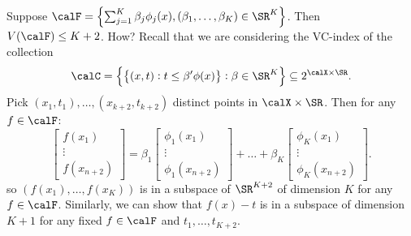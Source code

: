 \begin{example*}
	Suppose \(\calF = \left\{\sum_{j=1}^K \beta_j\phi_j(x), \left(\beta_1,\dots,\beta_K\right)\in\SR^K\right\}\). Then \(V(\calF) \leq K+2\). How? Recall that we are considering the VC-index of the collection
	\[
	\calC = \left\{\left\{(x,t): t \leq \beta'\phi(x)\right\}: \beta\in\SR^K\right\} \subseteq 2^{\calX\times\SR} 
	.\]
	Pick \((x_1,t_1),\dots,(x_{k+2},t_{k+2})\) distinct points in \(\calX\times\SR\). Then for any \(f\in\calF\):
	\[
		\begin{bmatrix} f\left(x_1\right) \\ \vdots \\ f\left(x_{n+2}\right) \end{bmatrix}  = 
		\beta_1 \begin{bmatrix} \phi_1\left(x_1\right) \\ \vdots \\ \phi_1\left(x_{n+2}\right) \end{bmatrix} + \dots + 
		\beta_K \begin{bmatrix} \phi_K\left(x_1\right) \\ \vdots \\ \phi_K\left(x_{n+2}\right) \end{bmatrix} 
	.\]
	so \(\left(f(x_1),\dots,f(x_K)\right)\) is in a subspace of \(\SR^{K+2}\) of dimension \(K\) for any \(f\in\calF\). Similarly, we can show that \(f(x) - t\) is in a subspace of dimension \(K+1\) for any fixed \(f\in\calF\) and \(t_1,\dots,t_{K+2}\).


\end{example*}
